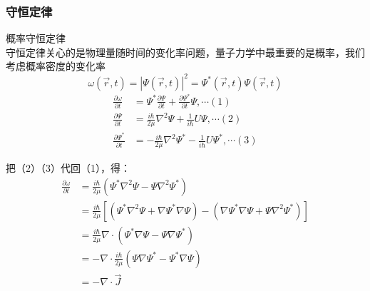 \begin{frame} 
    \frametitle{守恒定律 }
    \bullet 概率守恒定律\\ \vspace{0.3em}
    守恒定律关心的是物理量随时间的变化率问题，量子力学中最重要的是概率，我们考虑概率密度的变化率
    $$\omega (\vec{r}, t)=|\Psi(\vec{r}, t)|^{2}=\Psi^{*}(\vec{r}, t) \Psi(\vec{r}, t)$$
    \begin{equation*}
        \begin{split}
            \frac{\partial \omega}{\partial t} &=\Psi^{*} \frac{\partial \Psi}{\partial t}+\frac{\partial \Psi^{*}}{\partial t} \Psi, \cdots (1) \\
            \frac{\partial \Psi}{\partial t} & =\frac{i \hbar}{2 \mu} \nabla^{2} \Psi+\frac{1}{i \hbar} U \Psi, \cdots (2) \\
            \frac{\partial \Psi^{*}}{\partial t} & =-\frac{i \hbar}{2 \mu} \nabla^{2} \Psi^{*}-\frac{1}{i \hbar} U \Psi^{*}, \cdots (3) 
        \end{split}
    \end{equation*}
\end{frame}

\begin{frame} 
    把（2）（3）代回（1），得：
    \begin{equation*}
        \begin{split}
        \frac{\partial \omega}{\partial t}
        &=\frac{i \hbar}{2 \mu}\left(\Psi^{*} \nabla^{2} \Psi-\Psi \nabla^{2} \Psi^{*}\right) \\
        &=\frac{i \hbar}{2 \mu}[(\Psi^{*} \nabla^{2} \Psi + \nabla \Psi^{*} \nabla \Psi)- (\nabla \Psi^{*} \nabla \Psi +\Psi \nabla^{2} \Psi^{*})] \\ 
        &=\frac{i \hbar}{2 \mu} \nabla \cdot\left(\Psi^{*} \nabla \Psi-\Psi \nabla \Psi^{*}\right)\\
        &=-\nabla \cdot \frac{i \hbar}{2 \mu} \left(\Psi \nabla \Psi^{*}-\Psi^{*} \nabla \Psi\right) \\
        &=-\nabla \cdot \vec{J}
        \end{split}
    \end{equation*}
\end{frame}

